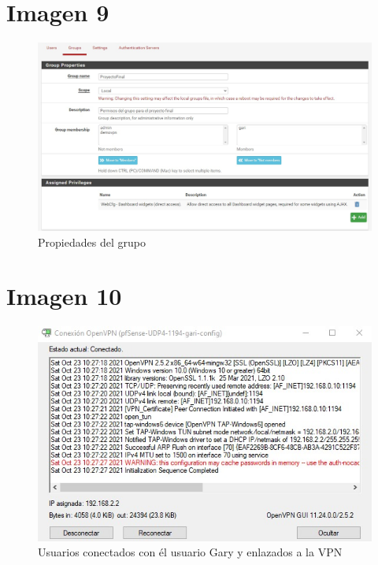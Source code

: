 \documentclass[12pt,letterspaper]{report}
\begin{document}
\chapter*{Imagen 9}
\vspace {0.3cm}
\begin{figure}[htb]
\centering
\includegraphics[scale=0.5]{Img9.jpg}
\caption{{Propiedades del grupo}}
\end{figure}\par
\vspace {0.1cm}


\chapter*{Imagen 10}
\vspace {0.3cm}
\begin{figure}[htb]
\centering
\includegraphics[scale=0.5]{Img10.jpg}
\caption{{Usuarios conectados con él usuario Gary y enlazados a la VPN}}
\end{figure}\par
\vspace {0.1cm}
\end{document}
